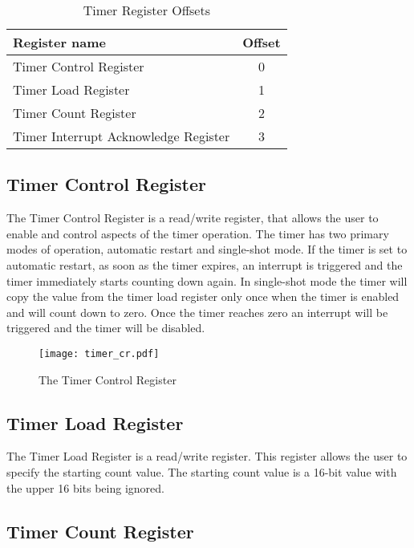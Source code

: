 \begin{table}[h]
\begin{center}
\begin{tabular}{|l|c|}
\hline
\textbf{Register name} & \textbf{Offset} \\
\hline
Timer Control Register & 0 \\
\hline
Timer Load Register & 1 \\
\hline
Timer Count Register & 2 \\
\hline
Timer Interrupt Acknowledge Register & 3 \\
\hline
\end{tabular}
\caption{Timer Register Offsets}
\label{table:timer_offsets}
\end{center}
\end{table}

\subsection{Timer Control Register}

The Timer Control Register is a read/write register, that allows the
user to enable and control aspects of the timer operation. The timer
has two primary modes of operation, automatic restart and single-shot
mode. If the timer is set to automatic restart, as soon as the timer
expires, an interrupt is triggered and the timer immediately starts
counting down again. In single-shot mode the timer will copy the value
from the timer load register only once when the timer is enabled and
will count down to zero. Once the timer reaches zero an interrupt will
be triggered and the timer will be disabled.

\begin{figure}[h]
\begin{center}
\texttt{[image: timer\_cr.pdf]}
\caption{The Timer Control Register}
\label{timer_cr_pic}
\end{center}
\end{figure}

\subsection{Timer Load Register}

The Timer Load Register is a read/write register. This register allows
the user to specify the starting count value. The starting count value
is a 16-bit value with the upper 16 bits being ignored.

\subsection{Timer Count Register}

